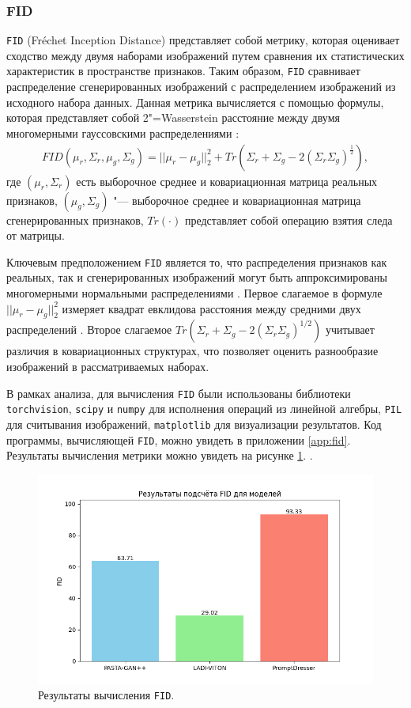 \subsubsection{FID}
\texttt{FID} (Fréchet Inception Distance) представляет собой метрику, которая оценивает сходство между двумя наборами изображений путем сравнения их статистических характеристик в пространстве признаков. Таким образом, \texttt{FID} сравнивает распределение сгенерированных изображений с распределением изображений из исходного набора данных. Данная метрика вычисляется с помощью формулы, которая представляет собой 2"=Wasserstein расстояние между двумя многомерными гауссовскими распределениями \cite{fid}:
\begin{gather}
FID(\mu_r, \Sigma_r, \mu_g, \Sigma_g) = ||\mu_r - \mu_g||_2^2 + Tr(\Sigma_r + \Sigma_g - 2(\Sigma_r \Sigma_g)^{\frac{1}{2}}),
\end{gather}
где $(\mu_r, \Sigma_r)$ есть выборочное среднее и ковариационная матрица реальных признаков, $(\mu_g, \Sigma_g)$ "--- выборочное среднее и ковариационная матрица сгенерированных признаков, $Tr(\cdot)$ представляет собой операцию взятия следа от матрицы.

Ключевым предположением \texttt{FID} является то, что распределения признаков как реальных, так и сгенерированных изображений могут быть аппроксимированы многомерными нормальными распределениями . Первое слагаемое в формуле $||\mu_r - \mu_g||_2^2$ измеряет квадрат евклидова расстояния между средними двух распределений . Второе слагаемое $Tr(\Sigma_r + \Sigma_g - 2(\Sigma_r \Sigma_g)^{1/2})$ учитывает различия в ковариационных структурах, что позволяет оценить разнообразие изображений в рассматриваемых наборах.

В рамках анализа, для вычисления \texttt{FID} были использованы библиотеки \texttt{torchvision}, \texttt{scipy} и \texttt{numpy} для исполнения операций из линейной алгебры, \texttt{PIL} для считывания изображений, \texttt{matplotlib} для визуализации результатов. Код программы, вычисляющей \texttt{FID}, можно увидеть в приложении \ref{app:fid}. Результаты вычисления метрики можно увидеть на рисунке \ref{fig:fid_results}. \cite{fid}.

\begin{figure}[H]
    \centering
    \includegraphics[width=0.85\linewidth]{images/fid_results.png}
    \caption{Результаты вычисления \texttt{FID}.}
    \label{fig:fid_results} 
\end{figure}

